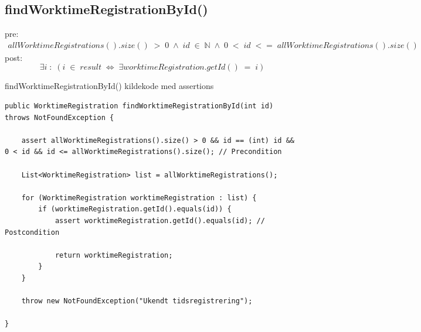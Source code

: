 \subsection{findWorktimeRegistrationById()} \label{sec:contract_findd_work}
\noindent pre: 
\begin{align}
    allWorktimeRegistrations().size()\; >\; 0 \;\wedge\; id \; \in \; \mathbb{N} \; \wedge \; 0 \; < \; id  \; <=\; allWorktimeRegistrations().size()
\end{align}
post: 
\begin{equation}
    \exists i\; :\; (i\; \in\; result\; \iff\; \exists worktimeRegistration.getId() \; = \; i)
\end{equation}

\begin{listing}[H]
    \centering
    \caption{findWorktimeRegistrationById() kildekode med assertions}\label{lst:find_work_time_registration_by_id_assertions}
    \begin{verbatim}
public WorktimeRegistration findWorktimeRegistrationById(int id) throws NotFoundException {

    assert allWorktimeRegistrations().size() > 0 && id == (int) id && 0 < id && id <= allWorktimeRegistrations().size(); // Precondition
    
    List<WorktimeRegistration> list = allWorktimeRegistrations();

    for (WorktimeRegistration worktimeRegistration : list) {
        if (worktimeRegistration.getId().equals(id)) {
            assert worktimeRegistration.getId().equals(id); // Postcondition
            
            return worktimeRegistration;
        }
    }

    throw new NotFoundException("Ukendt tidsregistrering");

}
    \end{verbatim}
\end{listing}


